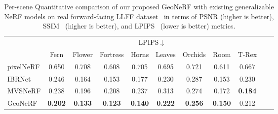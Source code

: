 \begin{table}[!t]
    \vspace{1.0ex}

    \begin{center}
        \begin{threeparttable}
            \begin{tabular}{l|cccccccccc}
            & \multicolumn{8}{c}{LPIPS$\downarrow$} \\
            &  Fern & Flower & Fortress & Horns & Leaves & Orchids & Room & T-Rex \\
            \hline
            pixelNeRF & 0.650 & 0.708 & 0.608 & 0.705 & 0.695 & 0.721 & 0.611 & 0.667 \\
            IBRNet & 0.246 & 0.164 & 0.153 & 0.177 & 0.230 & 0.287 & 0.153 & 0.230 \\
            MVSNeRF & 0.238 & 0.196 & 0.208 & 0.237 & 0.313 & 0.274 & 0.172 & \textbf{0.184} \\
            GeoNeRF & \textbf{0.202} & \textbf{0.133} & \textbf{0.123} & \textbf{0.140} & \textbf{0.222} & \textbf{0.256} & \textbf{0.150} & 0.212 \\
            \hline
            \end{tabular}
        \end{threeparttable}
    \end{center}
    \vspace{3ex}
    \caption{Per-scene Quantitative comparison of our proposed GeoNeRF with existing generalizable NeRF models on real forward-facing LLFF dataset~\citep{mildenhall2019llff} in terms of PSNR (higher is better), SSIM~\citep{wang2004image} (higher is better), and LPIPS~\citep{zhang2018unreasonable} (lower is better) metrics.}
    \label{table:per_scene_no_ft_llff}
\end{table}

\clearpage

